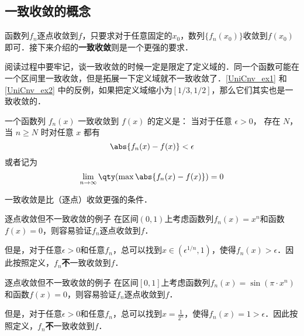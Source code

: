 
\begin{issues}
\issueDraft
\end{issues}


\subsection{一致收敛的概念}

函数列$f_n$逐点收敛到$f$，只要求对于任意固定的$x_0$，数列$\{f_n(x_0)\}$收敛到$f(x_0)$即可．接下来介绍的\textbf{一致收敛}则是一个更强的要求．

阅读过程中要牢记，谈一致收敛的时候一定是限定了定义域的．同一个函数可能在一个区间里一致收敛，但是拓展一下定义域就不一致收敛了．\autoref{UniCnv_ex1} 和\autoref{UniCnv_ex2} 中的反例，如果把定义域缩小为$[1/3, 1/2]$，那么它们其实也是一致收敛的．

一个函数列 $f_n(x)$ 一致收敛到 $f(x)$ 的定义是： 当对于任意 $\epsilon > 0$， 存在 $N$， 当 $n \geqslant N$ 时对任意 $x$ 都有
\begin{equation}\label{UniCnv_eq1}
\abs{f_n(x) - f(x)} < \epsilon
\end{equation}
或者记为
\begin{equation}
\lim_{n\to\infty} \qty(\max \abs{f_n(x) - f(x)}) = 0
\end{equation}

一致收敛是比（逐点）收敛更强的条件．

\begin{example}{逐点收敛但不一致收敛的例子}\label{UniCnv_ex1}
在区间$(0, 1)$上考虑函数列$f_n(x)=x^n$和函数$f(x)=0$，则容易验证$f_n$逐点收敛到$f$．

但是，对于任意$\epsilon>0$和任意$f_n$，总可以找到$x\in(\epsilon^{1/n}, 1)$，使得$f_n(x)>\epsilon$．因此按照定义，$f_n$\textbf{不}一致收敛到$f$．

\end{example}

\begin{example}{逐点收敛但不一致收敛的例子}\label{UniCnv_ex2}
在区间$[0, 1]$上考虑函数列$f_n(x)=\sin(\pi\cdot x^n)$和函数$f(x)=0$，则容易验证$f_n$逐点收敛到$f$．

但是，对于任意$\epsilon>0$和任意$f_n$，总可以找到$x=\frac{1}{2^n}$，使得$f_n(x)=1>\epsilon$．因此按照定义，$f_n$\textbf{不}一致收敛到$f$．

\end{example}


